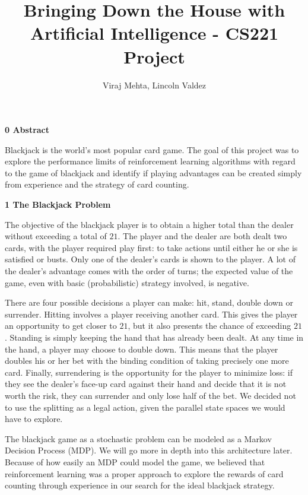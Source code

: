 \documentclass[12pt]{article}
\title{Bringing Down the House with Artificial Intelligence - CS221 Project}
\author{Viraj Mehta, Lincoln Valdez}
\date{}
\begin{document}
	\maketitle
	\vspace{-0.3in}
    
    {\large \textbf{0 Abstract}} \newline 
    
    Blackjack is the world's most popular card game. The goal of this project was to explore the performance limits of reinforcement learning algorithms with regard to the game of blackjack and identify if playing advantages can be created simply from experience and the strategy of card counting. \newline
    
    {\large \textbf{1 The Blackjack Problem}} \newline 
       
    The objective of the blackjack player is to obtain a higher total than the dealer without exceeding a total of $21$. The player and the dealer are both dealt two cards, with the player required play first: to take actions until either he or she is satisfied or busts. Only one of the dealer's cards is shown to the player. A lot of the dealer's advantage comes with the order of turns; the expected value of the game, even with basic (probabilistic) strategy involved, is negative. \newline 
    
    There are four possible decisions a player can make: hit, stand, double down or surrender. Hitting involves a player receiving another card. This gives the player an opportunity to get closer to $21$, but it also presents the chance of exceeding $21$. Standing is simply keeping the hand that has already been dealt. At any time in the hand, a player may choose to double down. This means that the player doubles his or her bet with the binding condition of taking precisely one more card. Finally, surrendering is the opportunity for the player to minimize loss: if they see the dealer's face-up card against their hand and decide that it is not worth the risk, they can surrender and only lose half of the bet. We decided not to use the splitting as a legal action, given the parallel state spaces we would have to explore. \newline
    
    The blackjack game as a stochastic problem can be modeled as a Markov Decision Process (MDP). We will go more in depth into this architecture later. Because of how easily an MDP could model the game, we believed that reinforcement learning was a proper approach to explore the rewards of card counting through experience in our search for the ideal blackjack strategy. \pagebreak 
    
\end{document}
